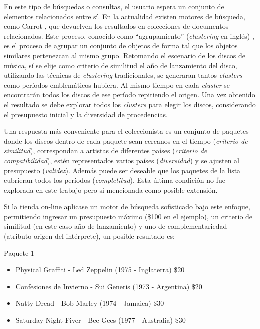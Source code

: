 En este tipo de búsquedas o consultas, el usuario espera un conjunto de elementos relacionados entre sí. En la actualidad existen motores de búsqueda, como Carrot \cite{url:carrot}, que devuelven los resultados en colecciones de documentos relacionados. Este proceso, conocido como ``agrupamiento'' (\textit{clustering} en inglés) \cite{opac-b1087461}, es el proceso de agrupar un conjunto de objetos de forma tal que los objetos similares pertenezcan al mismo grupo. Retomando el escenario de los discos de música, sí se elije como criterio de similitud el año de lanzamiento del disco, utilizando las técnicas de {\em clustering} tradicionales, se generaran tantos {\em clusters} como períodos emblemáticos hubiera. Al mismo tiempo en cada {\em cluster} se encontrarán todos los discos de ese período repitiendo el origen. Una vez obtenido el resultado se debe explorar todos los {\em clusters} para elegir los discos, considerando el presupuesto inicial y la diversidad de procedencias.

Una respuesta más conveniente para el coleccionista es un conjunto de paquetes donde los discos dentro de cada paquete sean cercanos en el tiempo ({\em criterio de similitud}), correspondan a artistas de diferentes países ({\em criterio de compatibilidad}), estén representados varios países ({\em diversidad}) y se ajusten al presupuesto ({\em validez}). Además puede ser deseable que los paquetes de la lista cubrieran todos los períodos ({\em completitud}). Esta última condición no fue explorada en este trabajo pero si mencionada como posible extensión.

Si la tienda on-line aplicase un motor de búsqueda sofisticado bajo este enfoque, permitiendo ingresar un presupuesto máximo (\$100 en el ejemplo), un criterio de similitud (en este caso año de lanzamiento) y uno de complementariedad (atributo origen del intérprete), un posible resultado es:

\begin{mybox}{Paquete 1}
	\begin{itemize}
		\item {\scriptsize Physical Graffiti - Led Zeppelin (1975 - Inglaterra) \$20}
		\item {\scriptsize Confesiones de Invierno - Sui Generis (1973 - Argentina) \$20}
		\item {\scriptsize Natty Dread - Bob Marley (1974 - Jamaica) \$30}
		\item {\scriptsize Saturday Night Fiver - Bee Gees (1977 - Australia) \$30}
	\end{itemize}
\end{mybox}

